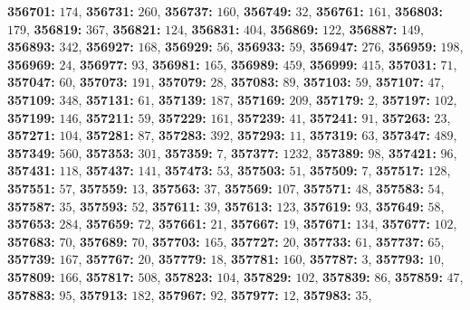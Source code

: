 \textsf{\bfseries 356701:} $174$, \textsf{\bfseries 356731:} $260$, \textsf{\bfseries 356737:} $160$, \textsf{\bfseries 356749:} $32$, \textsf{\bfseries 356761:} $161$, \textsf{\bfseries 356803:} $179$, \textsf{\bfseries 356819:} $367$, \textsf{\bfseries 356821:} $124$, \textsf{\bfseries 356831:} $404$, \textsf{\bfseries 356869:} $122$, \textsf{\bfseries 356887:} $149$, \textsf{\bfseries 356893:} $342$, \textsf{\bfseries 356927:} $168$, \textsf{\bfseries 356929:} $56$, \textsf{\bfseries 356933:} $59$, \textsf{\bfseries 356947:} $276$, \textsf{\bfseries 356959:} $198$, \textsf{\bfseries 356969:} $24$, \textsf{\bfseries 356977:} $93$, \textsf{\bfseries 356981:} $165$, \textsf{\bfseries 356989:} $459$, \textsf{\bfseries 356999:} $415$, \textsf{\bfseries 357031:} $71$, \textsf{\bfseries 357047:} $60$, \textsf{\bfseries 357073:} $191$, \textsf{\bfseries 357079:} $28$, \textsf{\bfseries 357083:} $89$, \textsf{\bfseries 357103:} $59$, \textsf{\bfseries 357107:} $47$, \textsf{\bfseries 357109:} $348$, \textsf{\bfseries 357131:} $61$, \textsf{\bfseries 357139:} $187$, \textsf{\bfseries 357169:} $209$, \textsf{\bfseries 357179:} $2$, \textsf{\bfseries 357197:} $102$, \textsf{\bfseries 357199:} $146$, \textsf{\bfseries 357211:} $59$, \textsf{\bfseries 357229:} $161$, \textsf{\bfseries 357239:} $41$, \textsf{\bfseries 357241:} $91$, \textsf{\bfseries 357263:} $23$, \textsf{\bfseries 357271:} $104$, \textsf{\bfseries 357281:} $87$, \textsf{\bfseries 357283:} $392$, \textsf{\bfseries 357293:} $11$, \textsf{\bfseries 357319:} $63$, \textsf{\bfseries 357347:} $489$, \textsf{\bfseries 357349:} $560$, \textsf{\bfseries 357353:} $301$, \textsf{\bfseries 357359:} $7$, \textsf{\bfseries 357377:} $1232$, \textsf{\bfseries 357389:} $98$, \textsf{\bfseries 357421:} $96$, \textsf{\bfseries 357431:} $118$, \textsf{\bfseries 357437:} $141$, \textsf{\bfseries 357473:} $53$, \textsf{\bfseries 357503:} $51$, \textsf{\bfseries 357509:} $7$, \textsf{\bfseries 357517:} $128$, \textsf{\bfseries 357551:} $57$, \textsf{\bfseries 357559:} $13$, \textsf{\bfseries 357563:} $37$, \textsf{\bfseries 357569:} $107$, \textsf{\bfseries 357571:} $48$, \textsf{\bfseries 357583:} $54$, \textsf{\bfseries 357587:} $35$, \textsf{\bfseries 357593:} $52$, \textsf{\bfseries 357611:} $39$, \textsf{\bfseries 357613:} $123$, \textsf{\bfseries 357619:} $93$, \textsf{\bfseries 357649:} $58$, \textsf{\bfseries 357653:} $284$, \textsf{\bfseries 357659:} $72$, \textsf{\bfseries 357661:} $21$, \textsf{\bfseries 357667:} $19$, \textsf{\bfseries 357671:} $134$, \textsf{\bfseries 357677:} $102$, \textsf{\bfseries 357683:} $70$, \textsf{\bfseries 357689:} $70$, \textsf{\bfseries 357703:} $165$, \textsf{\bfseries 357727:} $20$, \textsf{\bfseries 357733:} $61$, \textsf{\bfseries 357737:} $65$, \textsf{\bfseries 357739:} $167$, \textsf{\bfseries 357767:} $20$, \textsf{\bfseries 357779:} $18$, \textsf{\bfseries 357781:} $160$, \textsf{\bfseries 357787:} $3$, \textsf{\bfseries 357793:} $10$, \textsf{\bfseries 357809:} $166$, \textsf{\bfseries 357817:} $508$, \textsf{\bfseries 357823:} $104$, \textsf{\bfseries 357829:} $102$, \textsf{\bfseries 357839:} $86$, \textsf{\bfseries 357859:} $47$, \textsf{\bfseries 357883:} $95$, \textsf{\bfseries 357913:} $182$, \textsf{\bfseries 357967:} $92$, \textsf{\bfseries 357977:} $12$, \textsf{\bfseries 357983:} $35$, 
